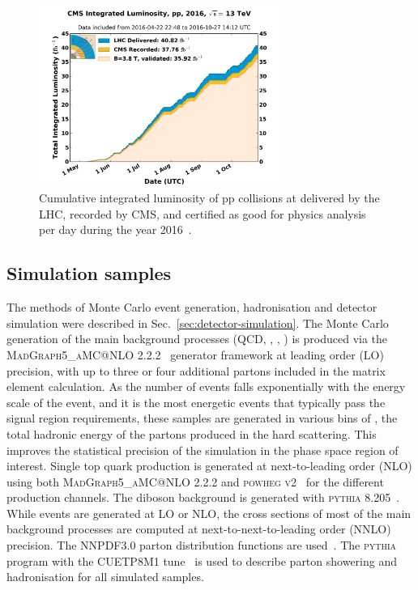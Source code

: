 \begin{figure}[!htb]
\includegraphics[width=0.7\textwidth]{figs/analysis/cmslumi}
\caption{Cumulative integrated luminosity of pp collisions at \com delivered by 
the LHC, recorded by CMS, and certified as good for physics analysis per day 
during the year 2016~\cite{cmslumi16}.}
\label{fig:lumi}
\end{figure}


\subsection{Simulation samples}
\label{sec:analysis-samples-mc}

The methods of Monte Carlo event generation, hadronisation and detector 
simulation were described in Sec.~\ref{sec:detector-simulation}.
The Monte Carlo generation of the main background processes (QCD, \zj, \wj, 
\ttbar) is produced via the \textsc{MadGraph5\_aMC@NLO 
2.2.2}~\cite{madgraph,madgraph-amcnlo} 
generator framework at leading order (LO) precision, with up to three or four 
additional partons included in the matrix element calculation. 
As the number of events falls exponentially with the energy scale of the event, 
and it is the most energetic events that typically pass the signal region 
requirements, these samples are generated in various bins of \hthat, the total 
hadronic energy of the partons produced in the hard scattering. 
This improves the statistical precision of the simulation in the phase space 
region of interest.
Single top quark production is generated at next-to-leading order (NLO) using 
both \textsc{MadGraph5\_aMC@NLO 2.2.2} and \textsc{powheg v2}~\cite{powheg} for 
the different production channels. The diboson background is generated with 
\textsc{pythia 8.205}~\cite{pythia}.
While events are generated at LO or NLO, the cross sections of most of the main 
background processes are computed at next-to-next-to-leading order (NNLO) 
precision. %
The NNPDF3.0 parton distribution functions are used~\cite{nnpdf}. The
\textsc{pythia} program with the \textsc{CUETP8M1} tune~\cite{cuet} is used to 
describe parton showering and hadronisation for all simulated samples.

